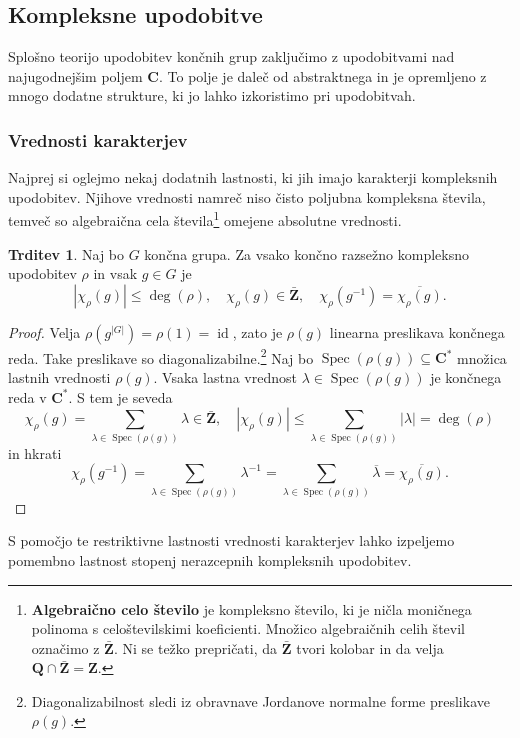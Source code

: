 \documentclass[11pt]{book}
\def\ZZ{\mathbf{Z}}
\def\QQ{\mathbf{Q}}
\def\CC{\mathbf{C}}
\DeclareMathOperator\Eigenvalues{Spec}
\DeclareMathOperator\id{id}
\def\definicija{\color{rdeca}\bf}
\theoremstyle{definition}
\theoremstyle{zgled}
\theoremstyle{zgledbrezstevilke}
\theoremstyle{odprtproblem}
\theoremstyle{domacanaloga}
\newenvironment{dokaz}
    {\color{siva}\begin{proof}}
    {\end{proof}}
\theoremstyle{izrek}
\newtheorem{trditev}[theorem]{Trditev}
\begin{document}
\subsection{Kompleksne upodobitve}

Splošno teorijo upodobitev končnih grup zaključimo z upodobitvami nad najugodnejšim poljem $\CC$. To polje je daleč od abstraktnega in je opremljeno z mnogo dodatne strukture, ki jo lahko izkoristimo pri upodobitvah.

\subsubsection{Vrednosti karakterjev}

Najprej si oglejmo nekaj dodatnih lastnosti, ki jih imajo karakterji kompleksnih upodobitev. Njihove vrednosti namreč niso čisto poljubna kompleksna števila, temveč so algebraična cela števila\footnote{{\definicija Algebraično celo število} je kompleksno število, ki je ničla moničnega polinoma s celoštevilskimi koeficienti. Množico algebraičnih celih števil označimo z $\bar{\ZZ}$. Ni se težko prepričati, da $\bar{\ZZ}$ tvori kolobar in da velja $\QQ \cap \bar{\ZZ} = \ZZ$.} omejene absolutne vrednosti. 

\begin{trditev}
Naj bo $G$ končna grupa. Za vsako končno razsežno kompleksno upodobitev $\rho$ in vsak $g \in G$ je
\[
    |\chi_{\rho}(g)| \leq \deg(\rho), \quad
    \chi_{\rho}(g) \in \bar{\ZZ}, \quad
    \chi_{\rho}(g^{-1}) = \overline{\chi_{\rho}(g)}. 
\] 
\end{trditev}
\begin{dokaz}
Velja $\rho(g^{|G|}) = \rho(1) = \id$, zato je $\rho(g)$ linearna preslikava končnega reda. Take preslikave so diagonalizabilne.\footnote{Diagonalizabilnost sledi iz obravnave Jordanove normalne forme preslikave $\rho(g)$.} Naj bo $\Eigenvalues(\rho(g)) \subseteq \CC^*$ množica lastnih vrednosti $\rho(g)$. Vsaka lastna vrednost $\lambda \in \Eigenvalues(\rho(g))$ je končnega reda v $\CC^*$. S tem je seveda
\[
    \chi_{\rho}(g) = \sum_{\lambda \in \Eigenvalues(\rho(g))} \lambda \in \bar{\ZZ},
    \quad
    |\chi_{\rho}(g)| \leq \sum_{\lambda \in \Eigenvalues(\rho(g))} |\lambda| = \deg(\rho)
\]
in hkrati
\[
    \chi_{\rho}(g^{-1}) = \sum_{\lambda \in \Eigenvalues(\rho(g))} \lambda^{-1}
    = \sum_{\lambda \in \Eigenvalues(\rho(g))} \overline{\lambda}
    = \overline{\chi_{\rho}(g)}.
\]
\end{dokaz}

S pomočjo te restriktivne lastnosti vrednosti karakterjev lahko izpeljemo pomembno lastnost stopenj nerazcepnih kompleksnih upodobitev.
\end{document}
